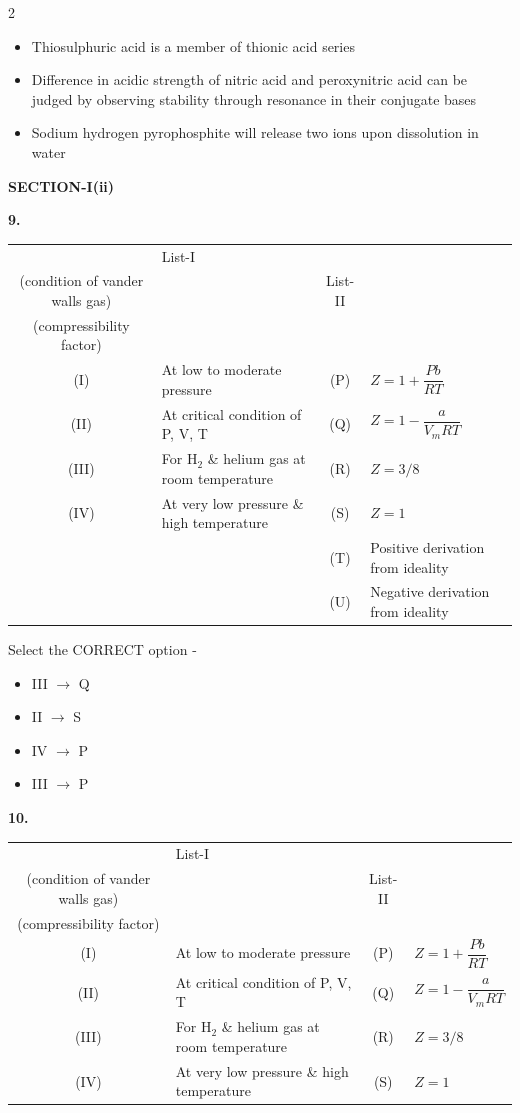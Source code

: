 \documentclass[10pt]{extarticle}
\newcommand{\sect}[1]{\par\smallskip\noindent\textbf{#1}\par}
\newcommand{\qn}[1]{\par\smallskip\noindent\textbf{#1.}~}
\newenvironment{qoptions}{\begin{itemize}[leftmargin=1.8em,itemsep=1pt,topsep=2pt,label={}]}{\end{itemize}}
\newcommand{\opt}[2]{\item[(#1)] #2}
\begin{document}
\begin{multicols}{2}
\begin{qoptions}
\opt{B}{Thiosulphuric acid is a member of thionic acid series}
\opt{C}{Difference in acidic strength of nitric acid and peroxynitric acid can be judged by observing stability through resonance in their conjugate bases}
\opt{D}{Sodium hydrogen pyrophosphite will release two ions upon dissolution in water}
\end{qoptions}
\sect{SECTION-I(ii)}
\qn{9} 
\begin{center}
{\footnotesize\setlength{\tabcolsep}{2pt}\begin{tabular}{|c|p{3.4cm}|c|p{3.4cm}|}\hline
 & \centering List-I\\(condition of vander walls gas) & & \centering List-II\\(compressibility factor)\tabularnewline\hline
(I) & At low to moderate pressure & (P) & $Z=1+\dfrac{Pb}{RT}$\\\hline
(II) & At critical condition of P, V, T & (Q) & $Z=1-\dfrac{a}{V_mRT}$\\\hline
(III) & For $\mathrm{H_2}$ \& helium gas at room temperature & (R) & $Z=3/8$\\\hline
(IV) & At very low pressure \& high temperature & (S) & $Z=1$\\\hline
 & & (T) & Positive derivation from ideality\\\hline
 & & (U) & Negative derivation from ideality\\\hline
\end{tabular}}
\end{center}
Select the CORRECT option -
\begin{qoptions}
\opt{A}{III $\to$ Q}
\opt{B}{II $\to$ S}
\opt{C}{IV $\to$ P}
\opt{D}{III $\to$ P}
\end{qoptions}
\qn{10} 
\begin{center}
{\footnotesize\setlength{\tabcolsep}{2pt}\begin{tabular}{|c|p{3.4cm}|c|p{3.4cm}|}\hline
 & \centering List-I\\(condition of vander walls gas) & & \centering List-II\\(compressibility factor)\tabularnewline\hline
(I) & At low to moderate pressure & (P) & $Z=1+\dfrac{Pb}{RT}$\\\hline
(II) & At critical condition of P, V, T & (Q) & $Z=1-\dfrac{a}{V_mRT}$\\\hline
(III) & For $\mathrm{H_2}$ \& helium gas at room temperature & (R) & $Z=3/8$\\\hline
(IV) & At very low pressure \& high temperature & (S) & $Z=1$\\\hline

\end{tabular}}
\end{center}
\end{multicols}
\end{document}
